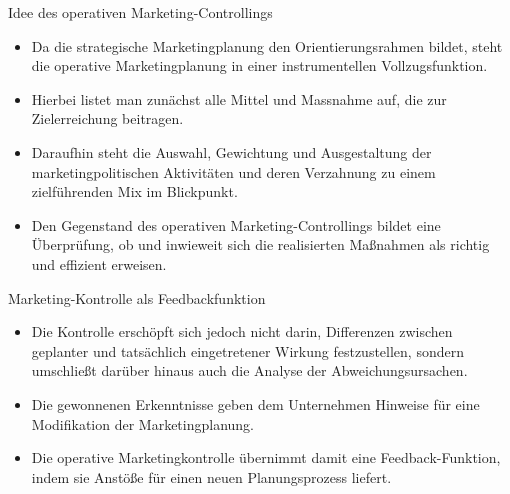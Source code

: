 \documentclass[12pt,ngerman,a4paper,ignorenonframetext,]{beamer}
\providecommand{\tightlist}{%
  \setlength{\itemsep}{0pt}\setlength{\parskip}{0pt}}
\begin{document}
\begin{frame}{Idee des operativen Marketing-Controllings}
\protect\hypertarget{idee-des-operativen-marketing-controllings}{}

\begin{itemize}
\tightlist
\item
  Da die strategische Marketingplanung den Orientierungsrahmen bildet,
  steht die operative Marketingplanung in einer instrumentellen
  Vollzugsfunktion.
\item
  Hierbei listet man zunächst alle Mittel und Massnahme auf, die zur
  Zielerreichung beitragen.
\item
  Daraufhin steht die Auswahl, Gewichtung und Ausgestaltung der
  marketingpolitischen Aktivitäten und deren Verzahnung zu einem
  zielführenden Mix im Blickpunkt.
\item
  Den Gegenstand des operativen Marketing-Controllings bildet eine
  Überprüfung, ob und inwieweit sich die realisierten Maßnahmen als
  richtig und effizient erweisen.
\end{itemize}

\end{frame}

\begin{frame}{Marketing-Kontrolle als Feedbackfunktion}
\protect\hypertarget{marketing-kontrolle-als-feedbackfunktion}{}

\begin{itemize}
\tightlist
\item
  Die Kontrolle erschöpft sich jedoch nicht darin, Differenzen zwischen
  geplanter und tatsächlich eingetretener Wirkung festzustellen, sondern
  umschließt darüber hinaus auch die Analyse der Abweichungsursachen.
\item
  Die gewonnenen Erkenntnisse geben dem Unternehmen Hinweise für eine
  Modifikation der Marketingplanung.
\item
  Die operative Marketingkontrolle übernimmt damit eine
  Feedback-Funktion, indem sie Anstöße für einen neuen Planungsprozess
  liefert.
\end{itemize}

\end{frame}
\end{document}
